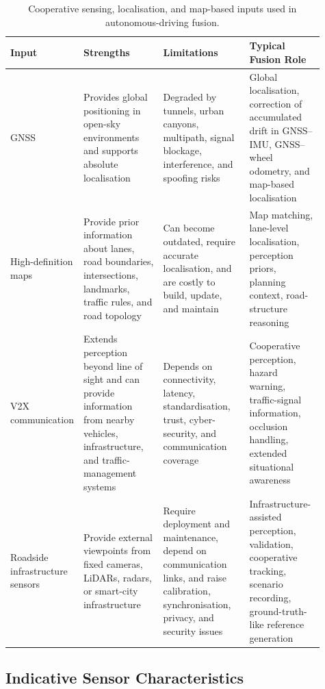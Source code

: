 \begin{table}[!t]
    \centering
    \renewcommand{\arraystretch}{1.25}%
    \small
    \caption{Cooperative sensing, localisation, and map-based inputs used in autonomous-driving fusion.}
    \label{tab:av-cooperative-inputs}
    \begin{tabular}{p{0.13\linewidth} p{0.26\linewidth} p{0.28\linewidth} p{0.24\linewidth}}
        \hline
        \textbf{Input} & \textbf{Strengths} & \textbf{Limitations} & \textbf{Typical Fusion Role} \\
        \hline
        GNSS & Provides global positioning in open-sky environments and supports absolute localisation & Degraded by tunnels, urban canyons, multipath, signal blockage, interference, and spoofing risks & Global localisation, correction of accumulated drift in GNSS--IMU, GNSS--wheel odometry, and map-based localisation \\
        \hline
        High-definition maps & Provide prior information about lanes, road boundaries, intersections, landmarks, traffic rules, and road topology & Can become outdated, require accurate localisation, and are costly to build, update, and maintain & Map matching, lane-level localisation, perception priors, planning context, road-structure reasoning \\
        \hline
        V2X communication & Extends perception beyond line of sight and can provide information from nearby vehicles, infrastructure, and traffic-management systems & Depends on connectivity, latency, standardisation, trust, cyber-security, and communication coverage & Cooperative perception, hazard warning, traffic-signal information, occlusion handling, extended situational awareness \\
        \hline
        Roadside infrastructure sensors & Provide external viewpoints from fixed cameras, LiDARs, radars, or smart-city infrastructure & Require deployment and maintenance, depend on communication links, and raise calibration, synchronisation, privacy, and security issues & Infrastructure-assisted perception, validation, cooperative tracking, scenario recording, ground-truth-like reference generation \\
        \hline
    \end{tabular}
\end{table}

\subsection{Indicative Sensor Characteristics}
\label{subsec:sensor-characteristics}

